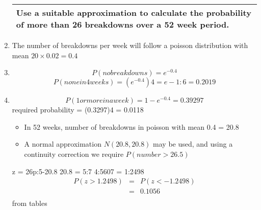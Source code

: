 \documentclass[a4paper,12pt]{article}
\begin{document}
\begin{enumerate}
\begin{table}[ht!]
\begin{tabular}{|p{15cm}|}
Use a suitable approximation to calculate the probability of more than 26 breakdowns over a 52 week period.   
 \\ \hline 
      \end{tabular}
    \end{table}
\item  The number of breakdowns per week will follow a poisson distribution with mean
$20 \times 0.02 = 0.4$
\item 
\[P(no breakdowns) = e^{-0.4}\]
\[P(none in 4 weeks) = (e^{-0.4})4 = e-1:6 = 0.2019\]
\item 
\[P(1 or more in a week) = 1 - e^{-0.4} = 0.39297\]
required probability = (0.3297)4 = 0.0118
\begin{itemize}
    \item In 52 weeks, number of breakdowns in poisson with mean 0.4  = 20.8 
    \item A normal
approximation $N(20.8,20.8)$ may be used, and using a continuity correction we
require $P(number > 26.5)$
\end{itemize}

z = 26p:5-20.8
20.8 = 5:7
4:5607 = 1:2498
\begin{eqnarray*}
P(z > 1.2498) 
&=& P(z < -1.2498) \\
&=& 0.1056\\
\end{eqnarray*} from tables
\end{enumerate}
\end{document}
